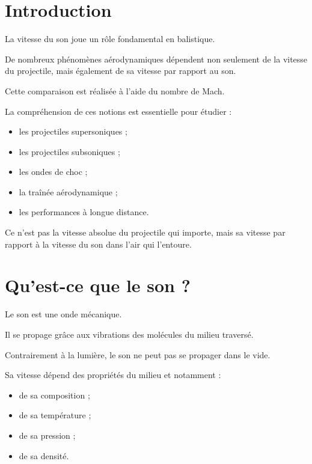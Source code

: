 
\section{Introduction}

La vitesse du son joue un rôle fondamental en balistique.

De nombreux phénomènes aérodynamiques dépendent non seulement de la vitesse
du projectile, mais également de sa vitesse par rapport au son.

Cette comparaison est réalisée à l'aide du nombre de Mach.

La compréhension de ces notions est essentielle pour étudier :

\begin{itemize}
\item les projectiles supersoniques ;
\item les projectiles subsoniques ;
\item les ondes de choc ;
\item la traînée aérodynamique ;
\item les performances à longue distance.
\end{itemize}

\begin{aretenir}

Ce n'est pas la vitesse absolue du projectile qui importe, mais sa vitesse
par rapport à la vitesse du son dans l'air qui l'entoure.

\end{aretenir}

\section{Qu'est-ce que le son ?}

Le son est une onde mécanique.

Il se propage grâce aux vibrations des molécules du milieu traversé.

Contrairement à la lumière, le son ne peut pas se propager dans le vide.

Sa vitesse dépend des propriétés du milieu et notamment :

\begin{itemize}
\item de sa composition ;
\item de sa température ;
\item de sa pression ;
\item de sa densité.
\end{itemize}

